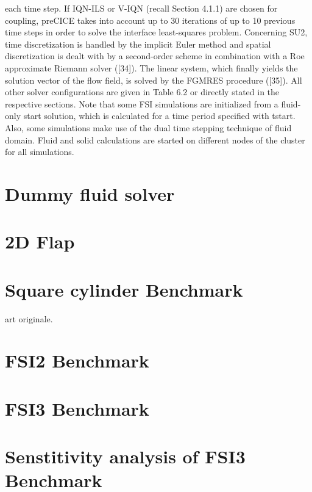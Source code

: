 each time step. If IQN-ILS or V-IQN (recall Section 4.1.1) are chosen for coupling, preCICE takes into
account up to 30 iterations of up to 10 previous time steps in order to solve the interface least-squares
problem.
Concerning SU2, time discretization is handled by the implicit Euler method and spatial discretization is
dealt with by a second-order scheme in combination with a Roe approximate Riemann solver ([34]). The
linear system, which finally yields the solution vector of the flow field, is solved by the FGMRES procedure
([35]). All other solver configurations are given in Table 6.2 or directly stated in the respective sections.
Note that some FSI simulations are initialized from a fluid-only start solution, which is calculated for a
time period specified with tstart. Also, some simulations make use of the dual time stepping technique of
fluid domain.
Fluid and solid calculations are started on different nodes of the cluster for all simulations.



\section{Dummy fluid solver}


\section{2D Flap}


\section{Square cylinder Benchmark}


\cite{ramm1998fluid} art originale.
\cite{walhorn2002space}
\cite{matthies2003partitioned}
\cite{dettmer2006computational}
\cite{olivier2009fluid}
\cite{wood2010partitioned}
\cite{kassiotis2011nonlinear}
\cite{habchi2013partitioned}
\cite{froehle2014high}


\section{FSI2 Benchmark}



\section{FSI3 Benchmark}


\section{Senstitivity analysis of FSI3 Benchmark}



